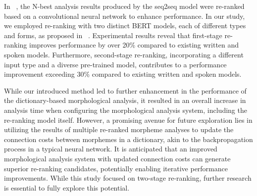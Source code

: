 \documentclass[AMS,STIX2COL]{WileyNJD-v2}
\begin{document}
    In ~\cite{ChoiYS2018}, the N-best analysis results produced by the seq2seq model were re-ranked based on a convolutional neural network to enhance performance.
    In our study, we employed re-ranking with two distinct BERT models, each of different types and forms, as proposed in ~\cite{Nogueira2019}.
    Experimental results reveal that first-stage re-ranking improves performance by over 20\% compared to existing written and spoken models.
    Furthermore, second-stage re-ranking, incorporating a different input type and a diverse pre-trained model, contributes to a performance improvement exceeding 30\% compared to existing written and spoken models.

    While our introduced method led to further enhancement in the performance of the dictionary-based morphological analysis, it resulted in an overall increase in analysis time when configuring the morphological analysis system, including the re-ranking model itself.
    However, a promising avenue for future exploration lies in utilizing the results of multiple re-ranked morpheme analyses to update the connection costs between morphemes in a dictionary, akin to the backpropagation process in a typical neural network.
    It is anticipated that an improved morphological analysis system with updated connection costs can generate superior re-ranking candidates, potentially enabling iterative performance improvements.
    While this study focused on two-stage re-ranking, further research is essential to fully explore this potential.
\end{document}
